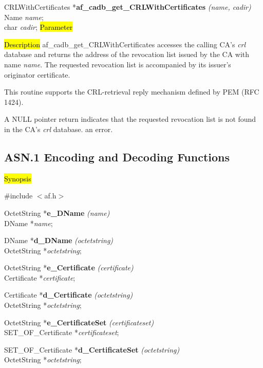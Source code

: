 CRLWithCertificates *{\bf af\_cadb\_get\_CRLWithCertificates} {\em (name, cadir)} \\
Name	{\em *name}; \\
char	{\em *cadir};
\hl{Parameter}


\hl{Description}
af\_cadb\_get\_CRLWithCertificates accesses the calling CA's {\em crl} database and returns the 
address of the revocation list issued by the CA with name {\em name}. The requested revocation list
is accompanied by its issuer's originator certificate.

This routine supports the CRL-retrieval reply mechanism defined by PEM (RFC 1424).

A NULL pointer return indicates
\bi
\m that the requested revocation list is not found in the CA's {\em crl} database.
\m an error.
\ei


\subsection{ASN.1 Encoding and Decoding Functions}
\label{Encoding-/Decoding-Routinen}

\hl{Synopsis}

\#include $<$af.h$>$ 

OctetString *{\bf e\_DName} {\em (name)} \\
DName *{\em name};

DName *{\bf d\_DName} {\em (octetstring)} \\
OctetString *{\em octetstring};

OctetString *{\bf e\_Certificate} {\em (certificate)} \\
Certificate *{\em certificate};

Certificate *{\bf d\_Certificate} {\em (octetstring)} \\
OctetString *{\em octetstring};

OctetString *{\bf e\_CertificateSet} {\em (certificateset)} \\
SET\_OF\_Certificate *{\em certificateset};

SET\_OF\_Certificate *{\bf d\_CertificateSet} {\em (octetstring)} \\
OctetString *{\em octetstring};

